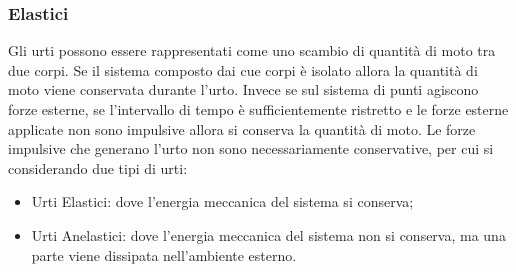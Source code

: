 \documentclass{article}
\numberwithin{equation}{subsection}
\begin{document}
\subsubsection{Elastici}
Gli urti possono essere rappresentati come uno scambio di quantità di moto tra due corpi. 
Se il sistema composto dai cue corpi è isolato allora la quantità di 
moto viene conservata durante l'urto. Invece se sul sistema di punti agiscono forze esterne, se l'intervallo di tempo è sufficientemente ristretto e le forze esterne applicate 
non sono impulsive allora si conserva la quantità di moto. Le forze impulsive che generano l'urto non sono necessariamente conservative, per cui si considerando 
due tipi di urti: 
\begin{itemize}
    \item Urti Elastici: dove l'energia meccanica del sistema si conserva;
    \item Urti Anelastici: dove l'energia meccanica del sistema non si conserva, ma una parte viene dissipata nell'ambiente esterno.
\end{itemize}
\end{document}
